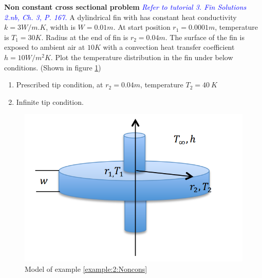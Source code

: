 \begin{example}
\label{example:2:Noncons}
\textbf{Non constant cross sectional problem}
\textcolor{blue} {\emph{Refer to tutorial 3.  Fin Solutions 2.nb, Ch. 3, P. 167.}}
A dylindrical fin with has constant heat conductivity  $k=3W/m.K$, width is
$W=0.01m$. At start position $r_1=0.0001m$, temperature is $T_1=30K$. Radius at
the end of fin is $r_2=0.04m$. The surface of the fin is exposed to ambient air at
$10K$ with a convection heat transfer coefficient $h=10W/m^2K$.
Plot the temperature distribution in the fin under below conditions. (Shown in figure \ref{fig:2:16})

\begin{enumerate}
\item Prescribed tip condition, at $r_2=0.04m$, temperature $T_2=40~K$
\item Infinite tip condition.
\end{enumerate}
\begin{figure}[h!]
  \centering
    \includegraphics[scale=0.4]{figures/ch2/16}
    \caption{Model of example \ref{example:2:Noncons}}
    \label{fig:2:16}
\end{figure}
\end{example}

